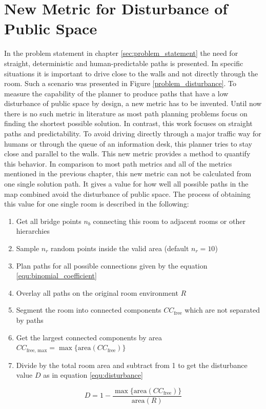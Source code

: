 \section{New Metric for Disturbance of Public Space}
\label{sec:new_metric}
In the problem statement in chapter \ref{sec:problem_statement} the need for straight, deterministic and human-predictable paths is presented. In specific situations it is important to drive close to the walls and not directly through the room. Such a scenario was presented in Figure \ref{problem_disturbance}. To measure the capability of the planner to produce paths that have a low disturbance of public space by design, a new metric has to be invented. Until now there is no such metric in literature as most path planning problems focus on finding the shortest possible solution. In contrast, this work focuses on straight paths and predictability. To avoid driving directly through a major traffic way for humans or through the queue of an information desk, this planner tries to stay close and parallel to the walls. This new metric provides a method to quantify this behavior. In comparison to most path metrics and all of the metrics mentioned in the previous chapter, this new metric can not be calculated from one single solution path. It gives a value for how well all possible paths in the map combined avoid the disturbance of public space. The process of obtaining this value for one single room is described in the following:

\begin{enumerate}
    \item Get all bridge points \(n_b\) connecting this room to adjacent rooms or other hierarchies
    \item Sample \(n_r\) random points inside the valid area (default \(n_r = 10\))
    \item Plan paths for all possible connections given by the equation \ref{equ:binomial_coefficient}
    \item Overlay all paths on the original room environment \(R\)
    \item Segment the room into connected components \(CC_{\text{free}}\) which are not separated by paths
    \item Get the largest connected components by area \(CC_{\text{free, max}} = \max \{\text{area}(CC_{\text{free}})\}\)
    \item Divide by the total room area and subtract from 1 to get the disturbance value \(D\) as in equation \ref{equ:disturbance}
\end{enumerate}
\begin{equation}
\label{equ:disturbance}
    D = 1 - \frac{\max \{\text{{area}}(CC_{\text{{free}}})\}}{{\text{{area}}(R)}}
\end{equation}

